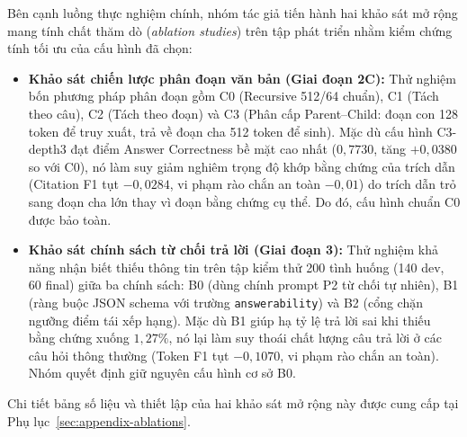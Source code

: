 Bên cạnh luồng thực nghiệm chính, nhóm tác giả tiến hành hai khảo sát mở rộng mang tính chất thăm dò (\textit{ablation studies}) trên tập phát triển nhằm kiểm chứng tính tối ưu của cấu hình đã chọn:

\begin{itemize}
  \item \textbf{Khảo sát chiến lược phân đoạn văn bản (Giai đoạn 2C):} Thử nghiệm bốn phương pháp phân đoạn gồm C0 (Recursive 512/64 chuẩn), C1 (Tách theo câu), C2 (Tách theo đoạn) và C3 (Phân cấp Parent--Child: đoạn con 128 token để truy xuất, trả về đoạn cha 512 token để sinh). Mặc dù cấu hình C3-depth3 đạt điểm Answer Correctness bề mặt cao nhất ($0{,}7730$, tăng $+0{,}0380$ so với C0), nó làm suy giảm nghiêm trọng độ khớp bằng chứng của trích dẫn (Citation F1 tụt $-0{,}0284$, vi phạm rào chắn an toàn $-0{,}01$) do trích dẫn trỏ sang đoạn cha lớn thay vì đoạn bằng chứng cụ thể. Do đó, cấu hình chuẩn C0 được bảo toàn.
  \item \textbf{Khảo sát chính sách từ chối trả lời (Giai đoạn 3):} Thử nghiệm khả năng nhận biết thiếu thông tin trên tập kiểm thử 200 tình huống (140 dev, 60 final) giữa ba chính sách: B0 (dùng chính prompt P2 từ chối tự nhiên), B1 (ràng buộc JSON schema với trường \texttt{answerability}) và B2 (cổng chặn ngưỡng điểm tái xếp hạng). Mặc dù B1 giúp hạ tỷ lệ trả lời sai khi thiếu bằng chứng xuống $1{,}27\%$, nó lại làm suy thoái chất lượng câu trả lời ở các câu hỏi thông thường (Token F1 tụt $-0{,}1070$, vi phạm rào chắn an toàn). Nhóm quyết định giữ nguyên cấu hình cơ sở B0.
\end{itemize}

Chi tiết bảng số liệu và thiết lập của hai khảo sát mở rộng này được cung cấp tại Phụ lục~\ref{sec:appendix-ablations}.
